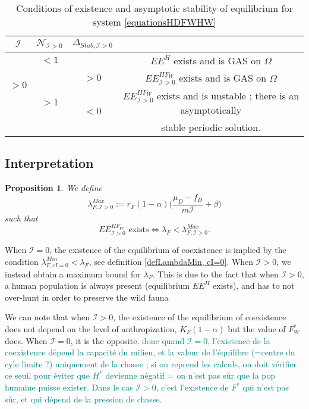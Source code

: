 \documentclass{article}
\newcommand{\lfw}{\lambda_{F}}
\newcommand{\lfw}{\lambda_{F}}
\newcommand{\cI}{\mathcal{I}}
\newcommand{\marc}[1]{\textcolor{teal}{#1}}
\newtheorem{prop}{Proposition}
\begin{document}
\begin{table}[!ht]
\def\arraystretch{2}
\centering
\begin{tabular}{c|c|c|c}
$\cI$ & $\mathcal{N}_{\cI > 0} $ & $\Delta_{Stab, \cI > 0}$ & \\
\hline
\multirow{3}{*}{$>0$} & $<1$ & &$EE^{H}$ exists and is GAS on $\Omega$ \\
\cline{2-4}
 & \multirow{3}{*}{$> 1$}  & $>0$ &$EE^{HF_W}_{\cI>0}$ exists and is GAS on $\Omega$ \\
 \cline{3-4}
 & & \multirow{2}{*}{$ < 0$} & $EE^{HF_W}_{\cI>0}$ exists and is unstable ; there is an asymptotically \\
 & & &  stable periodic solution. \\
\end{tabular}
\caption{\centering Conditions of existence and asymptotic stability of equilibrium for system \eqref{equationsHDFWHW}}
\end{table}

\subsection{Interpretation}

\begin{prop}
We define 
$$\lambda_{F, \cI>0}^{Max} := r_F(1-\alpha)\Big({\dfrac{\mu_D - f_D}{m\cI}+\beta\Big)}$$
such that 
$$
\text{$EE^{HF_W}_{\cI>0}$ exists} \Leftrightarrow  \lfw < \lambda_{F, \cI>0}^{Max}.
$$
\end{prop}

When $\cI = 0$, the existence of the equilibrium of coexistence is implied by the condition $\lambda_{F, cI = 0}^{Min} < \lfw$, see definition \ref{defLambdaMin, cI=0}. When $\cI > 0$, we instead obtain a maximum bound for $\lfw$. This is due to the fact that when $\cI > 0$, a human population is always present (equilibrium $EE^{H}$ exists), and has to not over-hunt in order to preserve the wild fauna 


We can note that when $\cI > 0$, the existence of the equilibrium of coexistence does not depend on the level of anthropization, $K_F(1-\alpha)$ but the value of $F^*_W$ does. When $\cI = 0$, it is the opposite. 
\marc{donc quand $\cI =0$, l'existence de la coexistence dépend la capacité du milieu, et la valeur de l'équilibre (=centre du cyle limite ?) uniquement de la chasse ; si on reprend les calculs, on doit vérifier ce seuil pour éviter que $H^*$ devienne négatif = on n'est pas sûr que la pop humaine puisse exister. Dans le cas $\cI > 0$, c'est l'existence de $F^*$ qui n'est pas sûr, et qui dépend de la pression de chasse.}
\end{document}
